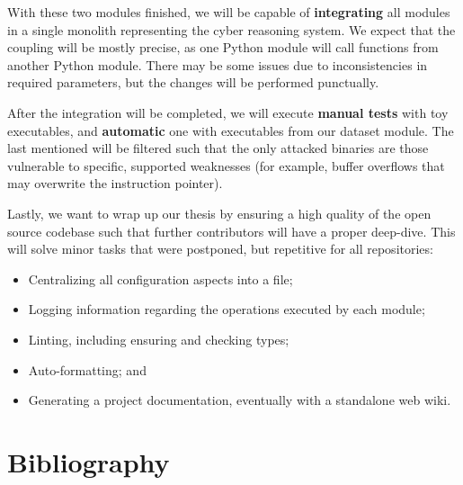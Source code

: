 \documentclass[12pt,a4paper,english,onecolumn]{IEEEtran}
\begin{document}
With these two modules finished, we will be capable of \textbf{integrating} all modules in a single monolith representing the cyber reasoning system. We expect that the coupling will be mostly precise, as one Python module will call functions from another Python module. There may be some issues due to inconsistencies in required parameters, but the changes will be performed punctually.

After the integration will be completed, we will execute \textbf{manual tests} with toy executables, and \textbf{automatic} one with executables from our dataset module. The last mentioned will be filtered such that the only attacked binaries are those vulnerable to specific, supported weaknesses (for example, buffer overflows that may overwrite the instruction pointer).

Lastly, we want to wrap up our thesis by ensuring a high quality of the open source codebase such that further contributors will have a proper deep-dive. This will solve minor tasks that were postponed, but repetitive for all repositories:

\begin{itemize}
    \item Centralizing all configuration aspects into a file;
    \item Logging information regarding the operations executed by each module;
    \item Linting, including ensuring and checking types;
    \item Auto-formatting; and
    \item Generating a project documentation, eventually with a standalone web wiki.
\end{itemize}

\section{Bibliography}
\nocite{*}
\printbibliography[heading=none]
\end{document}
